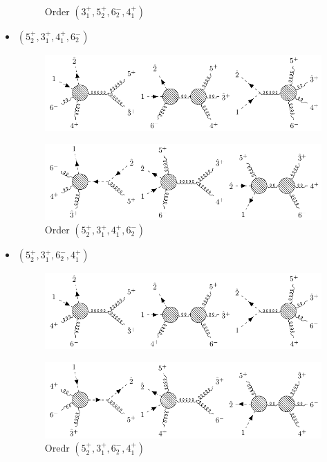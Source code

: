 \documentclass[12pt]{article}
\numberwithin{equation}{section}
\begin{document}
\begin{itemize}
\begin{figure}[H]
        \caption{Order $(3_1^+,5_2^+,6_2^-,4_1^+)$}
    \end{figure}
    \item $(5_2^+,3_1^+,4_1^+,6_2^-)$
    \begin{figure}[H]
        \centering
        \includegraphics{6pt1_4_1.pdf}
    \end{figure}
    \begin{figure}[H]
        \centering
        \includegraphics{6pt_1_4_2.pdf}
        \caption{Order $(5_2^+,3_1^+,4_1^+,6_2^-)$}
    \end{figure}
    \item $(5_2^+,3_1^+,6_2^-,4_1^+)$
    \begin{figure}[H]
        \centering
        \includegraphics{6pt1_5_1.pdf}
    \end{figure}
    \begin{figure}[H]
        \centering
        \includegraphics{6pt1_5_2.pdf}
        \caption{Oredr $(5_2^+,3_1^+,6_2^-,4_1^+)$}
    \end{figure}

\end{itemize}
\end{document}
